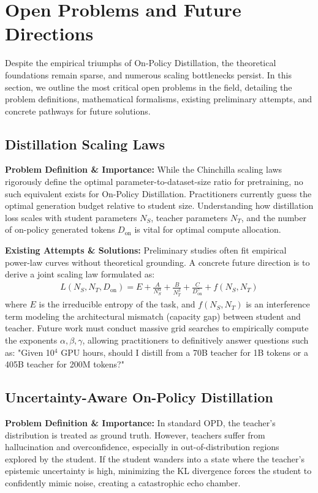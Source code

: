 \documentclass{article} %
\begin{document}
\section{Open Problems and Future Directions}
\label{sec:future}

Despite the empirical triumphs of On-Policy Distillation, the theoretical foundations remain sparse, and numerous scaling bottlenecks persist. In this section, we outline the most critical open problems in the field, detailing the problem definitions, mathematical formalisms, existing preliminary attempts, and concrete pathways for future solutions.

\subsection{Distillation Scaling Laws}
\textbf{Problem Definition \& Importance:} While the Chinchilla scaling laws rigorously define the optimal parameter-to-dataset-size ratio for pretraining, no such equivalent exists for On-Policy Distillation. Practitioners currently guess the optimal generation budget relative to student size. Understanding how distillation loss scales with student parameters $N_S$, teacher parameters $N_T$, and the number of on-policy generated tokens $D_{\text{on}}$ is vital for optimal compute allocation.

\textbf{Existing Attempts \& Solutions:} Preliminary studies often fit empirical power-law curves without theoretical grounding. A concrete future direction is to derive a joint scaling law formulated as:
\begin{align}
L(N_S, N_T, D_{\text{on}}) = E + \frac{A}{N_S^\alpha} + \frac{B}{N_T^\beta} + \frac{C}{D_{\text{on}}^\gamma} + f(N_S, N_T) \label{eq:scaling}
\end{align}
where $E$ is the irreducible entropy of the task, and $f(N_S, N_T)$ is an interference term modeling the architectural mismatch (capacity gap) between student and teacher. Future work must conduct massive grid searches to empirically compute the exponents $\alpha, \beta, \gamma$, allowing practitioners to definitively answer questions such as: "Given 10$^4$ GPU hours, should I distill from a 70B teacher for 1B tokens or a 405B teacher for 200M tokens?"

\subsection{Uncertainty-Aware On-Policy Distillation}
\textbf{Problem Definition \& Importance:} In standard OPD, the teacher's distribution is treated as ground truth. However, teachers suffer from hallucination and overconfidence, especially in out-of-distribution regions explored by the student. If the student wanders into a state where the teacher's epistemic uncertainty is high, minimizing the KL divergence forces the student to confidently mimic noise, creating a catastrophic echo chamber.
\end{document}
